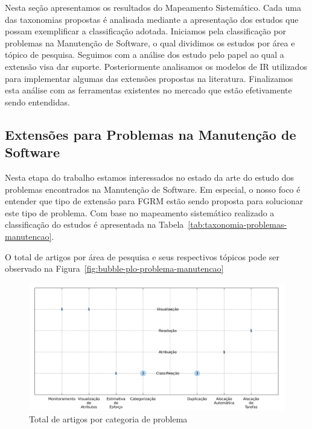 Nesta seção apresentamos os resultados do Mapeamento Sistemático. Cada uma das taxonomias propostas
é analisada mediante a apresentação dos estudos que possam exemplificar a classificação adotada.
Iniciamos pela classificação por problemas na Manutenção de Software, o qual dividimos os estudos
por área e tópico de pesquisa. Seguimos com a análise dos estudo pelo papel ao qual a extensão visa
dar suporte. Posteriormente analisamos os modelos de IR utilizados para implementar algumas das
extensões propostas na literatura. Finalizamos esta análise com as ferramentas existentes no mercado
que estão efetivamente sendo entendidas.

\subsection{Extensões para Problemas na Manutenção de Software}
\label{sub:extensões_para_problemas_na_manutenção_de_software}

Nesta etapa do trabalho estamos interessados no estado da arte do estudo dos problemas encontrados
na Manutenção de Software. Em especial, o nosso foco é entender que tipo de extensão para FGRM estão
sendo proposta para solucionar este tipo de problema. Com base no mapeamento sistemático realizado a
classificação do estudos é apresentada na Tabela~\ref{tab:taxonomia-problemas-manutencao}.



O total de artigos por área de pesquisa e seus respectivos tópicos pode ser observado na Figura~\ref{fig:bubble-plo-problema-manutencao}



\begin{figure}[htpb]
	\centering
	\includegraphics[width=0.8\linewidth]{./chapter-mapeamento-sistematico/img/bubble-plot-problema-manutencao.pdf}
	\caption{Total de artigos por categoria de problema}\label{fig:bubble-plot-problema-manutencao}
\end{figure}
